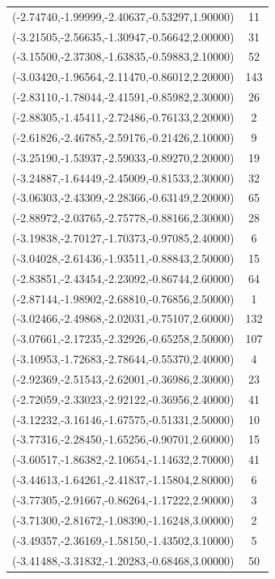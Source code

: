 \documentclass[12pt, fullpage,letterpaper]{article}
\begin{document}
\begin{longtable}{c|c}
(-2.74740,-1.99999,-2.40637,-0.53297,1.90000) & 11 \\
(-3.21505,-2.56635,-1.30947,-0.56642,2.00000) & 31 \\
(-3.15500,-2.37308,-1.63835,-0.59883,2.10000) & 52 \\
(-3.03420,-1.96564,-2.11470,-0.86012,2.20000) & 143 \\
(-2.83110,-1.78044,-2.41591,-0.85982,2.30000) & 26 \\
(-2.88305,-1.45411,-2.72486,-0.76133,2.20000) & 2 \\
(-2.61826,-2.46785,-2.59176,-0.21426,2.10000) & 9 \\
(-3.25190,-1.53937,-2.59033,-0.89270,2.20000) & 19 \\
(-3.24887,-1.64449,-2.45009,-0.81533,2.30000) & 32 \\
(-3.06303,-2.43309,-2.28366,-0.63149,2.20000) & 65 \\
(-2.88972,-2.03765,-2.75778,-0.88166,2.30000) & 28 \\
(-3.19838,-2.70127,-1.70373,-0.97085,2.40000) & 6 \\
(-3.04028,-2.61436,-1.93511,-0.88843,2.50000) & 15 \\
(-2.83851,-2.43454,-2.23092,-0.86744,2.60000) & 64 \\
(-2.87144,-1.98902,-2.68810,-0.76856,2.50000) & 1 \\
(-3.02466,-2.49868,-2.02031,-0.75107,2.60000) & 132 \\
(-3.07661,-2.17235,-2.32926,-0.65258,2.50000) & 107 \\
(-3.10953,-1.72683,-2.78644,-0.55370,2.40000) & 4 \\
(-2.92369,-2.51543,-2.62001,-0.36986,2.30000) & 23 \\
(-2.72059,-2.33023,-2.92122,-0.36956,2.40000) & 41 \\
(-3.12232,-3.16146,-1.67575,-0.51331,2.50000) & 10 \\
(-3.77316,-2.28450,-1.65256,-0.90701,2.60000) & 15 \\
(-3.60517,-1.86382,-2.10654,-1.14632,2.70000) & 41 \\
(-3.44613,-1.64261,-2.41837,-1.15804,2.80000) & 6 \\
(-3.77305,-2.91667,-0.86264,-1.17222,2.90000) & 3 \\
(-3.71300,-2.81672,-1.08390,-1.16248,3.00000) & 2 \\
(-3.49357,-2.36169,-1.58150,-1.43502,3.10000) & 5 \\
(-3.41488,-3.31832,-1.20283,-0.68468,3.00000) & 50 \\

\end{longtable}
\end{document}

